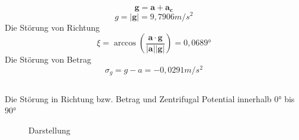 \documentclass[12pt]{article}
\begin{document}
\begin{equation*}
\bm{g} = \bm{a} + \bm{a_c}
\end{equation*}
\begin{equation*}
g = |\bm{g}| = 9,7906 m/s^2
\end{equation*}
Die Störung von Richtung
\begin{equation*}
\xi = \arccos(\frac{\bm{a} \cdot \bm{g}}{|\bm{a}| |\bm{g}|}) = 0,0689°
\end{equation*}
Die Störung von Betrag
\begin{equation*}
\sigma_g = g - a = -0,0291 m/s^2
\end{equation*}
\newpage
\subsection{}
Die Störung in Richtung bzw. Betrag und Zentrifugal Potential innerhalb $0°$ bis $90°$
\begin{figure}[ht]\centering
	\caption{Darstellung}
\end{figure}
\newpage
\end{document}
